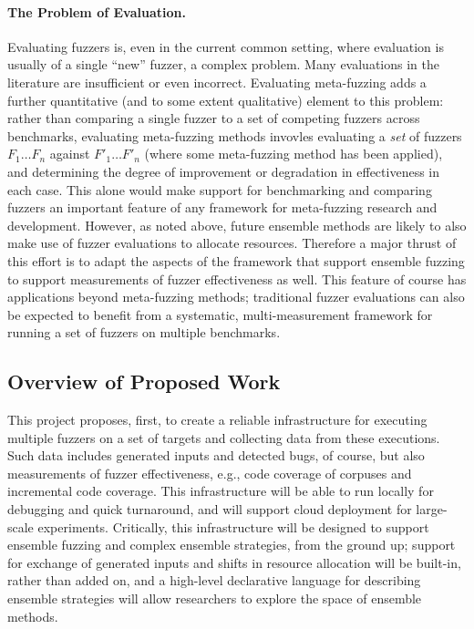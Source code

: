 \paragraph{The Problem of Evaluation.} Evaluating fuzzers is, even in the 
current common setting, where evaluation is usually of a single ``new'' fuzzer, 
a complex problem. Many evaluations in the literature are insufficient or even 
incorrect.  Evaluating meta-fuzzing adds a further quantitative (and to some 
extent qualitative) element to this problem: rather than comparing a single 
fuzzer to a set of competing fuzzers across benchmarks, evaluating meta-fuzzing 
methods invovles evaluating a \emph{set} of fuzzers $F_1 \ldots F_n$ against 
$F'_1 \ldots F'_n$ (where some meta-fuzzing method has been applied), and 
determining the degree of improvement or degradation in effectiveness in each 
case.  This alone would make support for benchmarking and comparing fuzzers an 
important feature of any framework for meta-fuzzing research and development.  
However, as noted above, future ensemble methods are likely to also make use of 
fuzzer evaluations to allocate resources.  Therefore a major thrust of this 
effort is to adapt the aspects of the framework that support ensemble fuzzing 
to support measurements of fuzzer effectiveness as well.  This feature of 
course has applications beyond meta-fuzzing methods; traditional fuzzer 
evaluations can also be expected to benefit from a systematic, 
multi-measurement framework for running a set of fuzzers on multiple benchmarks.

\subsection{Overview of Proposed Work}

This project proposes, first, to create a reliable infrastructure for executing 
multiple fuzzers on a set of targets and collecting data from these executions. 
 Such data includes generated inputs and detected bugs, of course, but also 
measurements of fuzzer effectiveness, e.g., code coverage of corpuses and 
incremental code coverage.  This infrastructure will be able to run locally for 
debugging and quick turnaround, and will support cloud deployment for 
large-scale experiments. Critically, this infrastructure will be designed to 
support ensemble fuzzing and complex ensemble strategies, from the ground up; 
support for exchange of generated inputs and shifts in resource allocation will 
be built-in, rather than added on, and a high-level declarative language for 
describing ensemble strategies will allow researchers to explore the space of 
ensemble methods.

